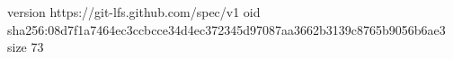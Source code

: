 version https://git-lfs.github.com/spec/v1
oid sha256:08d7f1a7464ec3ccbcce34d4ec372345d97087aa3662b3139c8765b9056b6ae3
size 73
